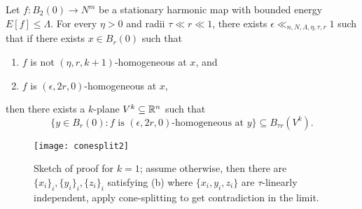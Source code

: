 \begin{corollary}
	Let $f: B_2 (0) \to N^m$ be a stationary harmonic map with bounded energy $E[f] \leq \Lambda$. For every $\eta > 0$ and radii $\tau \ll r \ll 1$, there exists $\epsilon \ll_{n, N, \Lambda, \eta, \tau, r} 1$ such that if there exists $x \in B_r (0)$ such that 
	\begin{enumerate}
		\item $f$ is not $(\eta, r, k + 1)$-homogeneous at $x$, and
		\item $f$ is $(\epsilon, 2r, 0)$-homogeneous at $x$,\label{cor:coneb}
	\end{enumerate}
	then there exists a $k$-plane $V^k \subseteq \mathbb R^n$ such that 
		\[ \{ y \in B_r (0) : \text{$f$ is $(\epsilon, 2r, 0)$-homogeneous at $y$} \} \subseteq B_{\tau r} (V^k) .\] \label{cor:cone}
\end{corollary}

\begin{figure}[h]
\begin{center}
	\texttt{[image: conesplit2]}
	\caption{Sketch of proof for $k = 1$; assume otherwise, then there are $\{x_i\}_i, \{y_i\}_i, \{z_i\}_i$ satisfying (b) where $\{x_i, y_i, z_i\}$ are $\tau$-linearly independent, apply cone-splitting to get contradiction in the limit.}
\end{center}	
\end{figure}
